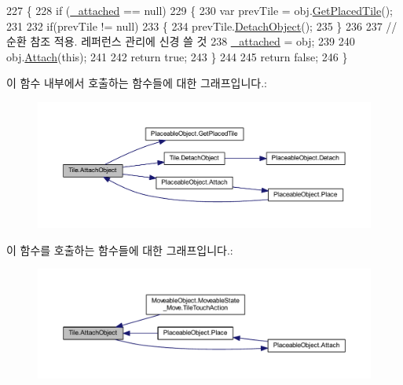 \begin{DoxyCode}
227     \{
228         \textcolor{keywordflow}{if} (\hyperlink{class_tile_aa548ae60732f4d054b6777436baefdd5}{\_attached} == null)
229         \{
230             var prevTile = obj.\hyperlink{class_placeable_object_ab44a9b122632ac3cf0babb5040e8a201}{GetPlacedTile}();
231 
232             \textcolor{keywordflow}{if}(prevTile != null)
233             \{
234                 prevTile.\hyperlink{class_tile_ab8ab187ab674cfb222f761feac3b20b3}{DetachObject}();
235             \}
236 
237             \textcolor{comment}{// 순환 참조 적용. 레퍼런스 관리에 신경 쓸 것}
238             \hyperlink{class_tile_aa548ae60732f4d054b6777436baefdd5}{\_attached} = obj;
239 
240             obj.\hyperlink{class_placeable_object_a3176ec3d5d26b2a83cdc58b01e630aa1}{Attach}(\textcolor{keyword}{this});
241 
242             \textcolor{keywordflow}{return} \textcolor{keyword}{true};
243         \}
244 
245         \textcolor{keywordflow}{return} \textcolor{keyword}{false};
246     \}
\end{DoxyCode}


이 함수 내부에서 호출하는 함수들에 대한 그래프입니다.\+:\nopagebreak
\begin{figure}[H]
\begin{center}
\leavevmode
\includegraphics[width=350pt]{class_tile_a1969ee41c320c6e7748a33374942e07e_cgraph}
\end{center}
\end{figure}




이 함수를 호출하는 함수들에 대한 그래프입니다.\+:\nopagebreak
\begin{figure}[H]
\begin{center}
\leavevmode
\includegraphics[width=350pt]{class_tile_a1969ee41c320c6e7748a33374942e07e_icgraph}
\end{center}
\end{figure}


